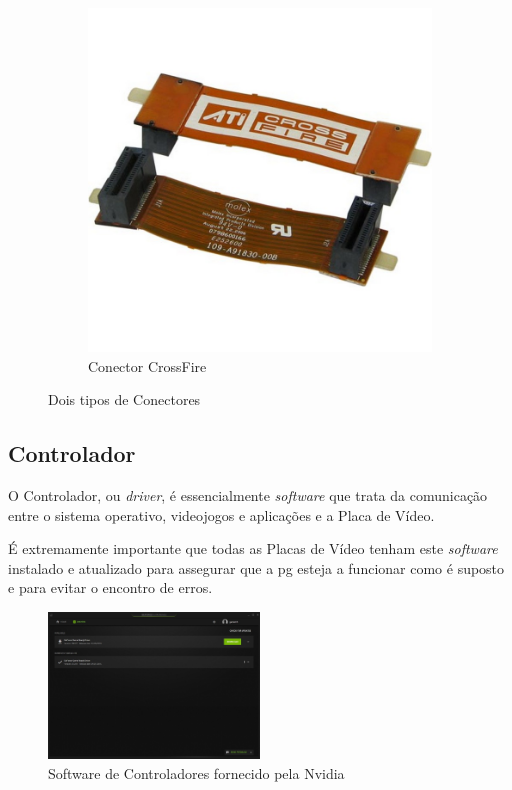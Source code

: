 \documentclass{report}
\begin{document}
\begin{figure}[h]
\begin{subfigure}[h]{0.3\textwidth}
         \includegraphics[width=\textwidth]{cf.jpg}
         \caption{Conector CrossFire}
         \label{fig:cf}
     \end{subfigure}
     \caption{Dois tipos de Conectores}
        \label{fig:slicf}
\end{figure}
\clearpage
\subsection{Controlador}

O Controlador, ou \textit{driver}, é essencialmente \textit{software} que trata da comunicação entre o sistema operativo, videojogos e aplicações e a Placa de Vídeo.

É extremamente importante que todas as Placas de Vídeo tenham este \textit{software} instalado e atualizado para assegurar que a \ac{pg} esteja a funcionar como é suposto e para evitar o encontro de erros.

\begin{figure}[h]
\centering
\includegraphics[width=0.5\textwidth]{nvidia.jpg}
\caption{Software de Controladores fornecido pela Nvidia}
\label{fig:nvidia}
\end{figure}
\end{document}
